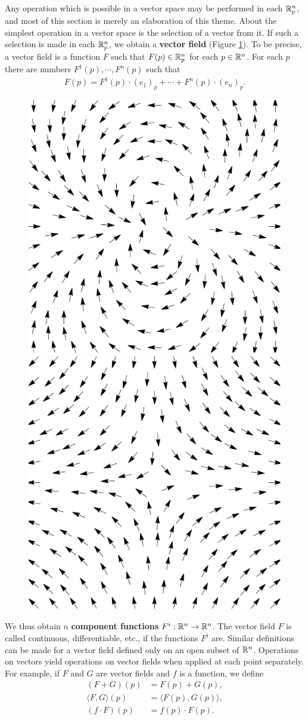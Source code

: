 Any operation which is possible in a vector space may be
performed in each $\mathbb{R}^n_p$, and most of this section is merely an
elaboration of this theme. About the simplest operation in a vector space is the 
selection of a vector from it. If such a selection is made in each $\mathbb{R}^n_p$, we 
obtain a \textbf{vector field} (Figure \ref{Fig 4-2}). To be precise, a vector field is a 
function $F$ such that $F(p)\in \mathbb{R}^n_p$ for each $p\in\mathbb{R}^n$. For each 
$p$ there are numbers $F^1(p), \cdots,F^n(p)$ such that
\begin{align*}
    F(p) = F^1(p)\cdot (e_1)_p + \cdots + F^n(p)\cdot (e_n)_p.
\end{align*}

\begin{figure}[!htb]
    \centering
    \includegraphics[width=.4\linewidth, angle=90]{./pics/Fig4-2-(1).pdf}
    \includegraphics[width=.4\linewidth, angle=90]{./pics/Fig4-2-(2).pdf}
    \caption{}
    \label{Fig 4-2}
\end{figure}

We thus obtain $n$ \textbf{component functions} $F^i:\mathbb{R}^n\to \mathbb{R}^n$.
The vector field $F$ is called continuous, differentiable, etc., if the
functions $F^i$ are. Similar definitions can be made for a vector
field defined only on an open subset of $\mathbb{R}^n$. Operations on
vectors yield operations on vector fields when applied at each
point separately. For example, if $F$ and $G$ are vector fields
and $f$ is a function, we define
\begin{align*}
    (F+G)(p) & = F(p) + G(p), \\
    \langle F, G\rangle(p) & = \langle F(p), G(p)\rangle, \\
    (f\cdot F)(p) & = f(p)\cdot F(p).
\end{align*}

